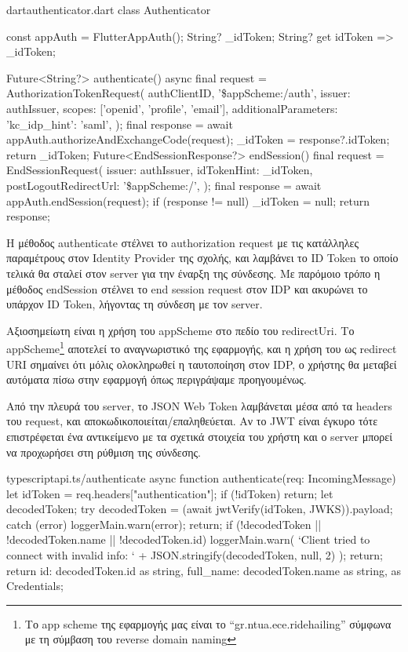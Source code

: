 \documentclass[../thesis.tex]{subfiles}
\begin{document}
\begin{codeblock}{dart}{authenticator.dart}
  class Authenticator {
    const appAuth = FlutterAppAuth();
    String? _idToken;
    String? get idToken => _idToken;
  
    Future<String?> authenticate() async {
      final request = AuthorizationTokenRequest(
        authClientID,
        '\$appScheme:/auth',
        issuer: authIssuer,
        scopes: ['openid', 'profile', 'email'],
        additionalParameters: {'kc_idp_hint': 'saml'},
      );
      final response = await appAuth.authorizeAndExchangeCode(request);
      _idToken = response?.idToken;
      return _idToken;
    }
    Future<EndSessionResponse?> endSession() {
      final request = EndSessionRequest(
        issuer: authIssuer,
        idTokenHint: _idToken,
        postLogoutRedirectUrl: '\$appScheme:/',
      );
      final response = await appAuth.endSession(request);
      if (response != null) _idToken = null;
      return response;
    }
  }  
\end{codeblock}

Η μέθοδος authenticate στέλνει το authorization request με τις κατάλληλες παραμέτρους στον Identity Provider της σχολής, και λαμβάνει το ID Token το οποίο τελικά θα σταλεί στον server για την έναρξη της σύνδεσης.
Με παρόμοιο τρόπο η μέθοδος endSession στέλνει το end session request στον IDP και ακυρώνει το υπάρχον ID Token, λήγοντας τη σύνδεση με τον server.

Αξιοσημείωτη είναι η χρήση του appScheme στο πεδίο του redirectUri.
Το appScheme\footnote{Το app scheme της εφαρμογής μας είναι το ``gr.ntua.ece.ridehailing'' σύμφωνα με τη σύμβαση του reverse domain naming} αποτελεί το αναγνωριστικό της εφαρμογής, και η χρήση του ως redirect URI σημαίνει ότι μόλις ολοκληρωθεί η ταυτοποίηση στον IDP, ο χρήστης θα μεταβεί αυτόματα πίσω στην εφαρμογή όπως περιγράψαμε προηγουμένως.

\bigskip

Από την πλευρά του server, το JSON Web Token λαμβάνεται μέσα από τα headers του request, και αποκωδικοποιείται/επαληθεύεται.
Αν το JWT είναι έγκυρο τότε επιστρέφεται ένα αντικείμενο με τα σχετικά στοιχεία του χρήστη και ο server μπορεί να προχωρήσει στη ρύθμιση της σύνδεσης.

\begin{codeblock}{typescript}{api.ts/authenticate}
  async function authenticate(req: IncomingMessage) {
    let idToken = req.headers["authentication"];
    if (!idToken) return;
    let decodedToken;
    try {
      decodedToken = (await jwtVerify(idToken, JWKS)).payload;
    } catch (error) {
      loggerMain.warn(error);
      return;
    }
    if (!decodedToken || !decodedToken.name || !decodedToken.id) {
      loggerMain.warn(
        `Client tried to connect with invalid info: ` +
          JSON.stringify(decodedToken, null, 2)
      );
      return;
    }
    return {
      id: decodedToken.id as string,
      full_name: decodedToken.name as string,
    } as Credentials;
  }
\end{codeblock}
\end{document}
